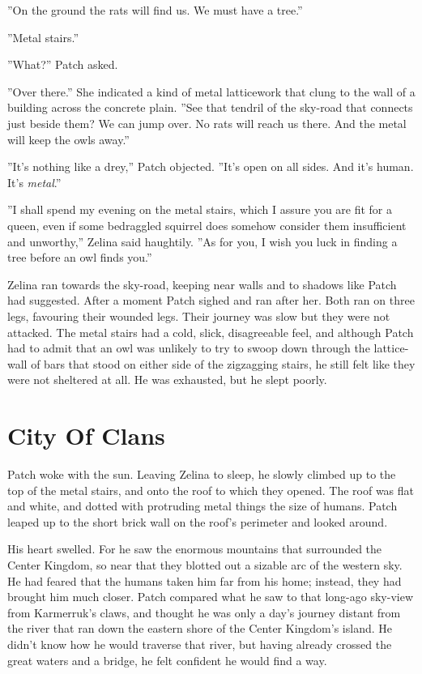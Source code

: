 \documentclass[12pt]{book}
\begin{document}
''On the ground the rats will find us. We must have a tree.''

''Metal stairs.''

''What?'' Patch asked.

''Over there.'' She indicated a kind of metal latticework that clung to the wall of a building across the concrete plain. ''See that tendril of the sky-road that connects just beside them? We can jump over. No rats will reach us there. And the metal will keep the owls away.''

''It's nothing like a drey,'' Patch objected. ''It's open on all sides. And it's human. It's {\it metal}.''

''I shall spend my evening on the metal stairs, which I assure you are fit for a queen, even if some bedraggled squirrel does somehow consider them insufficient and unworthy,'' Zelina said haughtily. ''As for you, I wish you luck in finding a tree before an owl finds you.''

Zelina ran towards the sky-road, keeping near walls and to shadows like Patch had suggested. After a moment Patch sighed and ran after her. Both ran on three legs, favouring their wounded legs. Their journey was slow but they were not attacked. The metal stairs had a cold, slick, disagreeable feel, and although Patch had to admit that an owl was unlikely to try to swoop down through the lattice-wall of bars that stood on either side of the zigzagging stairs, he still felt like they were not sheltered at all. He was exhausted, but he slept poorly.


\section{City Of Clans}

Patch woke with the sun. Leaving Zelina to sleep, he slowly climbed up to the top of the metal stairs, and onto the roof to which they opened. The roof was flat and white, and dotted with protruding metal things the size of humans. Patch leaped up to the short brick wall on the roof's perimeter and looked around.

His heart swelled. For he saw the enormous mountains that surrounded the Center Kingdom, so near that they blotted out a sizable arc of the western sky. He had feared that the humans taken him far from his home; instead, they had brought him much closer. Patch compared what he saw to that long-ago sky-view from Karmerruk's claws, and thought he was only a day's journey distant from the river that ran down the eastern shore of the Center Kingdom's island. He didn't know how he would traverse that river, but having already crossed the great waters and a bridge, he felt confident he would find a way.
\end{document}
